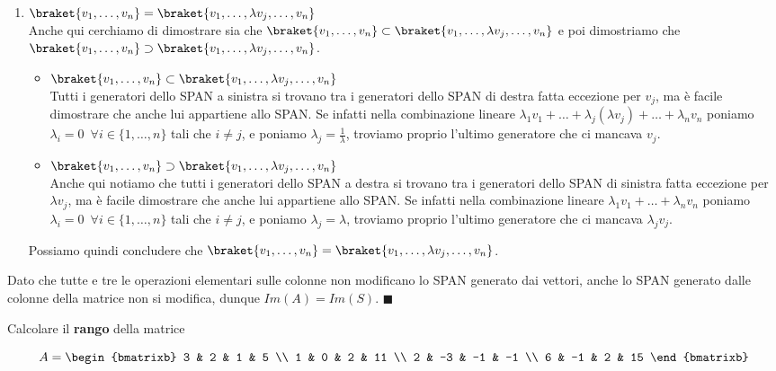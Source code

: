 \documentclass[11pt, a4paper, titlepage, oneside]{scrbook}
\begin{document}
\begin{enumerate}
    \item $\braket{v_1, \ldots, v_n} = \braket{v_1, \ldots, \lambda v_j, \ldots, v_n}$ \\
    Anche qui cerchiamo di dimostrare sia che $\braket{v_1, \ldots,v_n} \subset \braket{v_1, \ldots, \lambda v_j, \ldots, v_n}$ e poi dimostriamo che $\braket{v_1, \ldots, v_n} \supset \braket{v_1, \ldots, \lambda v_j, \ldots, v_n}$. 
    \begin{itemize}
        \item $\braket{v_1, \ldots, v_n} \subset \braket{v_1, \ldots, \lambda v_j, \ldots, v_n}$ \\
        Tutti i generatori dello SPAN a sinistra si trovano tra i generatori dello SPAN di destra fatta eccezione per $v_j$, ma è facile dimostrare che anche lui appartiene allo SPAN. Se infatti nella combinazione lineare $\lambda_1 v_1 + \ldots + \lambda_j (\lambda v_j) + \ldots + \lambda_n v_n$ poniamo \mbox{$\lambda_i = 0 \enspace \forall i \in \{1, \ldots, n\}$} tali che $i \neq j$, e poniamo $\lambda_j = \frac{1}{\lambda}$, troviamo proprio l'ultimo generatore che ci mancava $v_j$. 
        \item $\braket{v_1, \ldots, v_n} \supset \braket{v_1, \ldots, \lambda v_j, \ldots, v_n}$ \\
        Anche qui notiamo che tutti i generatori dello SPAN a destra si trovano tra i generatori dello SPAN di sinistra fatta eccezione per $\lambda v_j$, ma è facile dimostrare che anche lui appartiene allo SPAN. Se infatti nella combinazione lineare $\lambda_1 v_1 + \ldots + \lambda_n v_n$ poniamo \mbox{$\lambda_i = 0 \enspace \forall i \in \{1, \ldots, n\}$} tali che $i \neq j$, e poniamo $\lambda_j = \lambda$, troviamo proprio l'ultimo generatore che ci mancava $\lambda_j v_j$. 
    \end{itemize}
    Possiamo quindi concludere che $\braket{v_1, \ldots, v_n} = \braket{v_1, \ldots, \lambda v_j, \ldots, v_n}$.
\end{enumerate}

Dato che tutte e tre le operazioni elementari sulle colonne non modificano lo SPAN generato dai vettori, anche lo SPAN generato dalle colonne della matrice non si modifica, dunque $Im(A) = Im(S)$. $\blacksquare$


\Esempio \nopagebreak

Calcolare il \textbf{rango} della matrice \nopagebreak

\[ A = 
\begin{bmatrixb}
3 & 2 & 1 & 5  \\
1 & 0 & 2 & 11 \\
2 & -3 & -1 & -1 \\
6 & -1 & 2 & 15 
\end{bmatrixb}
\]
\end{document}
